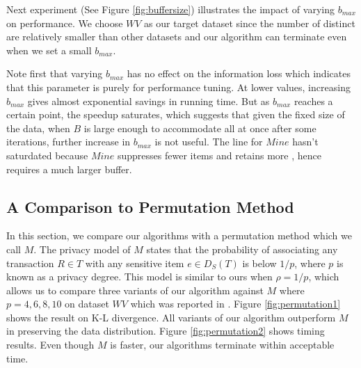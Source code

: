 Next experiment (See Figure \ref{fig:buffersize}) illustrates the impact of varying $b_{max}$ on performance.
We choose $WV$ as our target dataset since the number of
distinct \qids are relatively smaller than other datasets and our algorithm
can terminate even when we set a small $b_{max}$.

Note first that varying $b_{max}$ has no effect on the information loss which
indicates that this parameter is purely for performance tuning.
At lower values, increasing $b_{max}$ gives almost exponential
savings in running time. But as $b_{max}$ reaches a certain point, the speedup
saturates, which suggests that given the fixed size of the data,
when $B$ is large enough to accommodate all \qids at once after some iterations,
further increase in $b_{max}$ is not useful.
The line for $Mine$ hasn't saturdated because $Mine$ suppresses 
fewer items and retains more \qids, hence requires a much larger
buffer. 

\subsection{A Comparison to Permutation Method}
In this section, we compare our algorithms with a permutation method
\cite{2011:TKDE:Anonymous}
which we call $M$.
The privacy model of $M$
states that the probability of associating any transaction $R \in T$ with
any sensitive item $e \in D_S(T)$ is below $1/p$, where $p$ is known as
a privacy degree. This model is similar to ours when $\rho = 1/p$,
which allows us to compare three variants of our algorithm against
$M$ where $p=4, 6, 8, 10$ on dataset $WV$ which was reported in
\cite{2011:TKDE:Anonymous}.
Figure \ref{fig:permutation1} shows the result on K-L divergence.
All variants of our algorithm outperform $M$ in
preserving the data distribution. 
Figure \ref{fig:permutation2} shows timing results.
Even though $M$ is faster, our algorithms
terminate within acceptable time.


